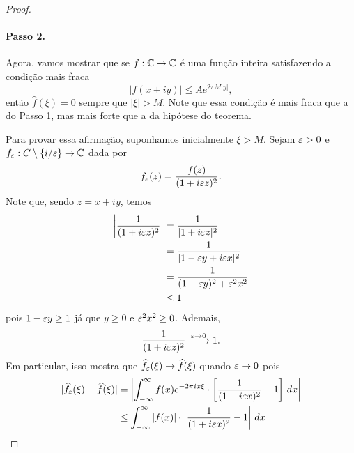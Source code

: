 \begin{proof}
            \paragraph{Passo 2.} Agora, vamos mostrar que se $f:\mathbb{C}\to\mathbb{C}$
            é uma função inteira satisfazendo a condição mais fraca
            \begin{equation*}
                |f(x+iy)| \leq Ae^{2\pi M|y|},
            \end{equation*}
            então $\widehat{f}(\xi) = 0$ sempre que $|\xi| > M$. Note
            que essa condição é mais fraca que a do Passo 1, mas mais
            forte que a da hipótese do teorema.
            
            Para provar essa afirmação, suponhamos inicialmente $\xi>M$.
            Sejam $\varepsilon>0$ e $f_{\varepsilon}:C\setminus\{i/\varepsilon\}\to\mathbb{C}$ dada por
            \begin{equation*}
                f_{\varepsilon}(z) = \frac{f(z)}{(1 + i\varepsilon z)^2}.
            \end{equation*}
            Note que, sendo $z=x+iy$, temos
            \begin{align*}
                \left| \frac{1}{(1+i\varepsilon z)^2} \right| &= \frac{1}{|1+i\varepsilon z|^2} \\
                                                     &= \frac{1}{|1-\varepsilon y + i\varepsilon x|^2} \\
                                                     &= \frac{1}{(1-\varepsilon y)^2 + \varepsilon^2x^2} \\
                                                     &\leq 1
            \end{align*}
            pois $1-\varepsilon y \geq 1$ já que $y\geq 0$ e $\varepsilon^2x^2 \geq 0$. Ademais, 
            \begin{equation*}
                \frac{1}{(1+i\varepsilon z)^2} \xrightarrow{\varepsilon \to 0} 1.
            \end{equation*}
            Em particular, isso mostra que $\widehat{f_{\varepsilon}}(\xi) \to \widehat{f}(\xi)$ quando
            $\varepsilon\to 0$ pois
            \begin{align*}
                | \widehat{f_{\e}}(\xi) - \widehat{f}(\xi) | &= \left| \int_{-\infty}^{\infty} 
                f(x)e^{-2\pi ix\xi}\cdot\left[\frac{1}{(1+i\e x)^2} - 1\right] \, dx \right| \\
                &\leq \int_{-\infty}^{\infty} |f(x)|\cdot\left| \frac{1}{(1+i\e x)^2} - 1 \right| \, dx \\

\end{align*}
\end{proof}
